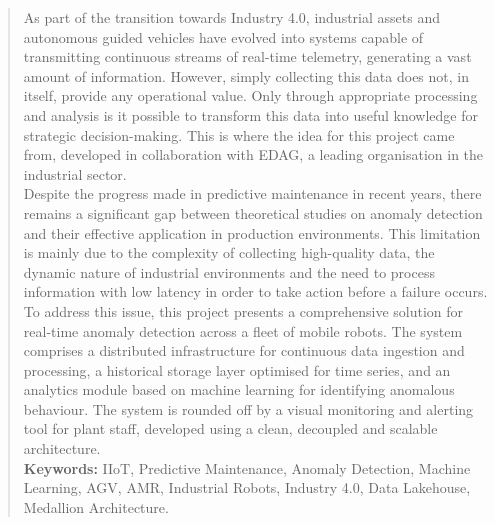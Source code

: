 \renewcommand{\abstractname}{Abstract}
\begin{abstract}
As part of the transition towards Industry 4.0, industrial assets and autonomous guided vehicles have evolved into systems capable of transmitting continuous streams of real-time telemetry, generating a vast amount of information. However, simply collecting this data does not, in itself, provide any operational value. Only through appropriate processing and analysis is it possible to transform this data into useful knowledge for strategic decision-making.
This is where the idea for this project came from, developed in collaboration with EDAG, a leading organisation in the industrial sector.\\

Despite the progress made in predictive maintenance in recent years, there remains a significant gap between theoretical studies on anomaly detection and their effective application in production environments. This limitation is mainly due to the complexity of collecting high-quality data, the dynamic nature of industrial environments and the need to process information with low latency in order to take action before a failure occurs.\\

To address this issue, this project presents a comprehensive solution for real-time anomaly detection across a fleet of mobile robots. The system comprises a distributed infrastructure for continuous data ingestion and processing, a historical storage layer optimised for time series, and an analytics module based on machine learning for identifying anomalous behaviour. The system is rounded off by a visual monitoring and alerting tool for plant staff, developed using a clean, decoupled and scalable architecture.\\
\medskip
\noindent\textbf{Keywords:} IIoT, Predictive Maintenance, Anomaly Detection, Machine Learning, AGV, AMR, Industrial Robots, Industry 4.0, Data Lakehouse, Medallion Architecture.
\end{abstract}
